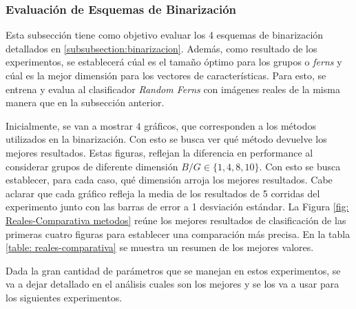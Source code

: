 \subsubsection{Evaluación de Esquemas de Binarización}
\label{subsubsection: eval_esquemas}


	Esta subsección tiene como objetivo evaluar los 4 esquemas de binarización detallados en \ref{subsubsection:binarizacion}. Además, como resultado de los experimentos, se establecerá cúal es el tamaño óptimo para los grupos o \textit{ferns} y cúal es la mejor dimensión para los vectores de características. Para esto, se entrena y evalua al clasificador \textit{Random Ferns} con imágenes reales de la misma manera que en la subsección anterior.
	
	Inicialmente, se van a mostrar $4$ gráficos, que corresponden a los métodos utilizados en la binarización. Con esto se busca ver qué método devuelve los mejores resultados. Estas figuras, reflejan la diferencia en performance al considerar grupos de diferente dimensión $B/G \in \{ 1, 4, 8, 10\}$. Con esto se busca establecer, para cada caso, qué dimensión arroja los mejores resultados. Cabe aclarar que cada gráfico refleja la media de los resultados de 5 corridas del experimento junto con las barras de error a 1 desviación estándar. La Figura \ref{fig: Reales-Comparativa metodos} reúne los mejores resultados de clasificación de las primeras cuatro figuras para establecer una comparación más precisa. En la tabla \ref{table: reales-comparativa} se muestra un resumen de los mejores valores.

	 Dada la gran cantidad de parámetros que se manejan en estos experimentos, se va a dejar detallado en el análisis cuales son los mejores y se los va a usar para los siguientes experimentos.

